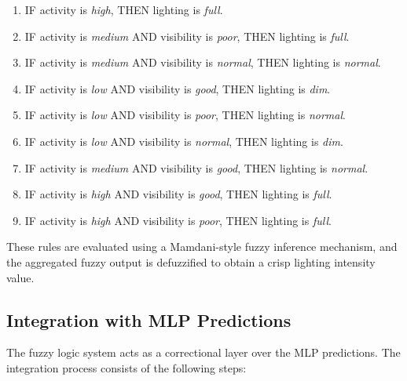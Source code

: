 \documentclass[conference]{IEEEtran}
\begin{document}
\begin{enumerate}
    \item IF activity is \emph{high}, THEN lighting is \emph{full}.
    \item IF activity is \emph{medium} AND visibility is \emph{poor}, THEN lighting is \emph{full}.
    \item IF activity is \emph{medium} AND visibility is \emph{normal}, THEN lighting is \emph{normal}.
    \item IF activity is \emph{low} AND visibility is \emph{good}, THEN lighting is \emph{dim}.
    \item IF activity is \emph{low} AND visibility is \emph{poor}, THEN lighting is \emph{normal}.
    \item IF activity is \emph{low} AND visibility is \emph{normal}, THEN lighting is \emph{dim}.
    \item IF activity is \emph{medium} AND visibility is \emph{good}, THEN lighting is \emph{normal}.
    \item IF activity is \emph{high} AND visibility is \emph{good}, THEN lighting is \emph{full}.
    \item IF activity is \emph{high} AND visibility is \emph{poor}, THEN lighting is \emph{full}.
\end{enumerate}

These rules are evaluated using a Mamdani-style fuzzy inference mechanism, and the aggregated fuzzy output is defuzzified to obtain a crisp lighting intensity value.

\subsection{Integration with MLP Predictions}

The fuzzy logic system acts as a correctional layer over the MLP predictions. The integration process consists of the following steps:
\end{document}
